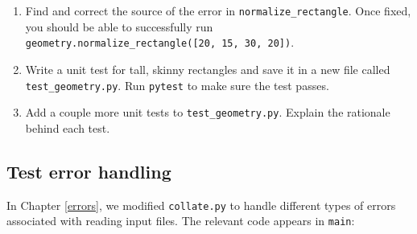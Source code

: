 \documentclass[
]{krantz}
\begin{document}
\begin{enumerate}
\def\labelenumi{\arabic{enumi}.}
\setcounter{enumi}{2}
\item
  Find and correct the source of the error in \texttt{normalize\_rectangle}.
  Once fixed, you should be able to successfully run
  \texttt{geometry.normalize\_rectangle({[}20,\ 15,\ 30,\ 20{]})}.
\item
  Write a unit test for tall, skinny rectangles and save it in a new file called
  \texttt{test\_geometry.py}. Run \texttt{pytest} to make sure the test passes.
\item
  Add a couple more unit tests to \texttt{test\_geometry.py}.
  Explain the rationale behind each test.
\end{enumerate}

\hypertarget{testing-ex-error-handling}{%
\subsection{Test error handling}\label{testing-ex-error-handling}}

In Chapter \ref{errors}, we modified \texttt{collate.py} to handle
different types of errors associated with reading input files.
The relevant code appears in \texttt{main}:
\end{document}
